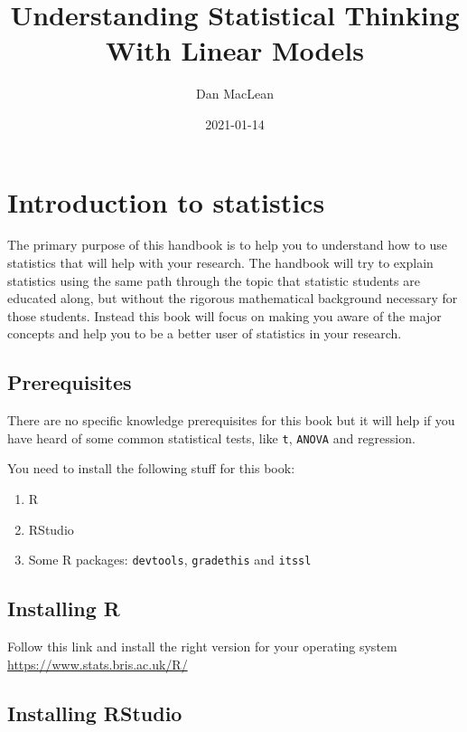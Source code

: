 \documentclass[
]{book}
\title{Understanding Statistical Thinking With Linear Models}
\author{Dan MacLean}
\date{2021-01-14}
\providecommand{\tightlist}{%
  \setlength{\itemsep}{0pt}\setlength{\parskip}{0pt}}
\begin{document}
\maketitle

{
\setcounter{tocdepth}{1}
\tableofcontents
}
\hypertarget{introduction-to-statistics}{%
\chapter{Introduction to statistics}\label{introduction-to-statistics}}

The primary purpose of this handbook is to help you to understand how to use statistics that will help with your research. The handbook will try to explain statistics using the same path through the topic that statistic students are educated along, but without the rigorous mathematical background necessary for those students. Instead this book will focus on making you aware of the major concepts and help you to be a better user of statistics in your research.

\hypertarget{prerequisites}{%
\section{Prerequisites}\label{prerequisites}}

There are no specific knowledge prerequisites for this book but it will help if you have heard of some common statistical tests, like \texttt{t}, \texttt{ANOVA} and regression.

You need to install the following stuff for this book:

\begin{enumerate}
\def\labelenumi{\arabic{enumi}.}
\tightlist
\item
  R
\item
  RStudio
\item
  Some R packages: \texttt{devtools}, \texttt{gradethis} and \texttt{itssl}
\end{enumerate}

\hypertarget{installing-r}{%
\section{Installing R}\label{installing-r}}

Follow this link and install the right version for your operating system \url{https://www.stats.bris.ac.uk/R/}

\hypertarget{installing-rstudio}{%
\section{Installing RStudio}\label{installing-rstudio}}
\end{document}
